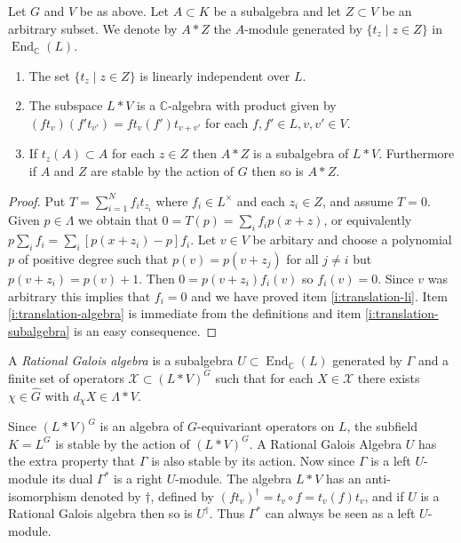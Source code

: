 \documentclass[11pt,fleqn]{article}
\newcommand\CC{\mathbb C}
\DeclareMathOperator\End{End}
\begin{document}
\begin{Lemma*}
Let $G$ and $V$ be as above. Let $A \subset K$ be a subalgebra and let $Z 
\subset V$ be an arbitrary subset. We denote by $A * Z$ the $A$-module generated by $\{t_z \mid z \in Z\}$ in $\End_\CC(L)$.
\begin{enumerate}
\item 
\label{i:translation-li}
The set $\{t_z \mid z \in Z\}$ is linearly independent over $L$.

\item 
\label{i:translation-algebra}
The subspace $L*V$ is a $\CC$-algebra with product given by $(ft_v)(f't_{v'}) 
= f t_v(f') t_{v+v'}$ for each $f,f' \in L, v,v' \in V$.

\item
\label{i:translation-subalgebra}
If $t_z(A) \subset A$ for each $z \in Z$ then $A * Z$ is a subalgebra of 
$L * V$. Furthermore if $A$ and $Z$ are stable by the action of $G$ then so is 
$A * Z$.
\end{enumerate}
\end{Lemma*}
\begin{proof}
Put $T = \sum_{i=1}^N f_i t_{z_i}$ where $f_i \in L^\times$ and each $z_i 
\in Z$, and assume $T = 0$. Given $p \in \Lambda$ we obtain that $0 = T(p) = 
\sum_i f_i p(x+z)$, or equivalently $p \sum_i f_i = \sum_i [p(x+z_i)- p] f_i$. 
Let $v \in V$ be arbitary and choose a polynomial $p$ of positive degree such 
that $p(v) = p(v + z_j)$ for all $j \neq i$ but $p(v + z_i) = p(v) + 1$. Then 
$0 = p(v+z_i) f_i(v)$ so $f_i(v) = 0$. Since $v$ was arbitrary this implies 
that $f_i = 0$ and we have proved item \ref{i:translation-li}. Item 
\ref{i:translation-algebra} is immediate from the definitions and item 
\ref{i:translation-subalgebra} is an easy consequence. 
\end{proof}

\begin{Definition}
A \emph{Rational Galois algebra} is a subalgebra $U \subset \End_\CC(L)$
generated by $\Gamma$ and a finite set of operators $\mathcal X \subset 
(L * V)^G$ such that for each $X \in \mathcal X$ there exists 
$\chi \in \hat G$ with $d_\chi X \in \Lambda * V$.
\end{Definition}
Since $(L*V)^G$ is an algebra of $G$-equivariant operators on $L$, the 
subfield $K = L^G$ is stable by the action of $(L * V)^G$. A Rational Galois
Algebra $U$ has the extra property that $\Gamma$ is also stable by its action.
Now since $\Gamma$ is a left $U$-module its dual $\Gamma^*$ is a right 
$U$-module. The algebra $L*V$ has an anti-isomorphism denoted by $\dagger$, 
defined by $(f t_v)^\dagger = t_v \circ f = t_v(f) t_v$, and if $U$ is a
Rational Galois algebra then so is $U^\dagger$. Thus $\Gamma^*$ can always
be seen as a left $U$-module. 
\end{document}
